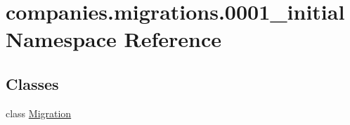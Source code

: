 \hypertarget{namespacecompanies_1_1migrations_1_10001__initial}{\section{companies.\-migrations.0001\-\_\-initial Namespace Reference}
\label{namespacecompanies_1_1migrations_1_10001__initial}
}
\subsection*{Classes}
\begin{DoxyCompactItemize}
\item 
class \hyperlink{classcompanies_1_1migrations_1_10001__initial_1_1_migration}{Migration}
\end{DoxyCompactItemize}
